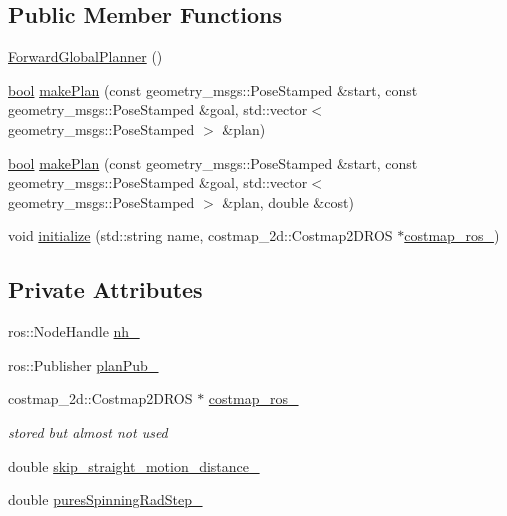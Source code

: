 \subsection*{Public Member Functions}
\begin{DoxyCompactItemize}
\item 
\hyperlink{classforward__global__planner_1_1ForwardGlobalPlanner_a17bc575ad43fecbd537194b50ff1919a}{Forward\+Global\+Planner} ()
\item 
\hyperlink{classbool}{bool} \hyperlink{classforward__global__planner_1_1ForwardGlobalPlanner_a0a358a0d157214dfc0a8a5d11a8f3419}{make\+Plan} (const geometry\+\_\+msgs\+::\+Pose\+Stamped \&start, const geometry\+\_\+msgs\+::\+Pose\+Stamped \&goal, std\+::vector$<$ geometry\+\_\+msgs\+::\+Pose\+Stamped $>$ \&plan)
\item 
\hyperlink{classbool}{bool} \hyperlink{classforward__global__planner_1_1ForwardGlobalPlanner_ae5179c8eaf5b753141b58b80be65c240}{make\+Plan} (const geometry\+\_\+msgs\+::\+Pose\+Stamped \&start, const geometry\+\_\+msgs\+::\+Pose\+Stamped \&goal, std\+::vector$<$ geometry\+\_\+msgs\+::\+Pose\+Stamped $>$ \&plan, double \&cost)
\item 
void \hyperlink{classforward__global__planner_1_1ForwardGlobalPlanner_ab7bdd2ba109a83441f4863b6ffe0d748}{initialize} (std\+::string name, costmap\+\_\+2d\+::\+Costmap2\+D\+R\+OS $\ast$\hyperlink{classforward__global__planner_1_1ForwardGlobalPlanner_a2c11785b3c88fcec54e45ae1aadc0df7}{costmap\+\_\+ros\+\_\+})
\end{DoxyCompactItemize}
\subsection*{Private Attributes}
\begin{DoxyCompactItemize}
\item 
ros\+::\+Node\+Handle \hyperlink{classforward__global__planner_1_1ForwardGlobalPlanner_aa2cafac2fc299721d52b3df7bddcd562}{nh\+\_\+}
\item 
ros\+::\+Publisher \hyperlink{classforward__global__planner_1_1ForwardGlobalPlanner_a4b20efe94ece6437775470088095132a}{plan\+Pub\+\_\+}
\item 
costmap\+\_\+2d\+::\+Costmap2\+D\+R\+OS $\ast$ \hyperlink{classforward__global__planner_1_1ForwardGlobalPlanner_a2c11785b3c88fcec54e45ae1aadc0df7}{costmap\+\_\+ros\+\_\+}
\begin{DoxyCompactList}\small\item\em stored but almost not used \end{DoxyCompactList}\item 
double \hyperlink{classforward__global__planner_1_1ForwardGlobalPlanner_a0e10cd64069d5723fbdb896fdcead82c}{skip\+\_\+straight\+\_\+motion\+\_\+distance\+\_\+}
\item 
double \hyperlink{classforward__global__planner_1_1ForwardGlobalPlanner_aa4247993c6651700fdaf8c067de19d8f}{pures\+Spinning\+Rad\+Step\+\_\+}
\end{DoxyCompactItemize}


